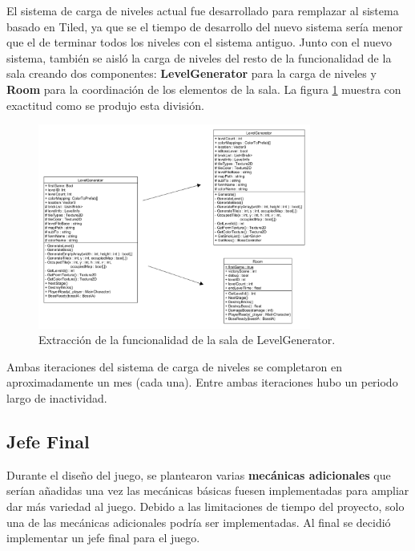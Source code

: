 El sistema de carga de niveles actual fue desarrollado para remplazar al sistema basado en Tiled, ya que se el tiempo de desarrollo del nuevo sistema sería menor que el de terminar todos los niveles con el sistema antiguo. Junto con el nuevo sistema, también se aisló la carga de niveles del resto de la funcionalidad de la sala creando dos componentes: \textbf{LevelGenerator} para la carga de niveles y \textbf{Room} para la coordinación de los elementos de la sala. La figura \ref{level_generator_comparation} muestra con exactitud como se produjo esta división.
\begin{figure}[h]
    \centering
    \includegraphics[width=0.8\textwidth]{images/resultados/desarrollo/level_generator_comparation}
    \caption{Extracción de la funcionalidad de la sala de LevelGenerator.}
    \label{level_generator_comparation}
\end{figure}

Ambas iteraciones del sistema de carga de niveles se completaron en aproximadamente un mes (cada una). Entre ambas iteraciones hubo un periodo largo de inactividad.

\subsection{Jefe Final}
Durante el diseño del juego, se plantearon varias \textbf{mecánicas adicionales} que serían añadidas una vez las mecánicas básicas fuesen implementadas para ampliar dar más variedad al juego. Debido a las limitaciones de tiempo del proyecto, solo una de las mecánicas adicionales podría ser implementadas. Al final se decidió implementar un jefe final para el juego.

